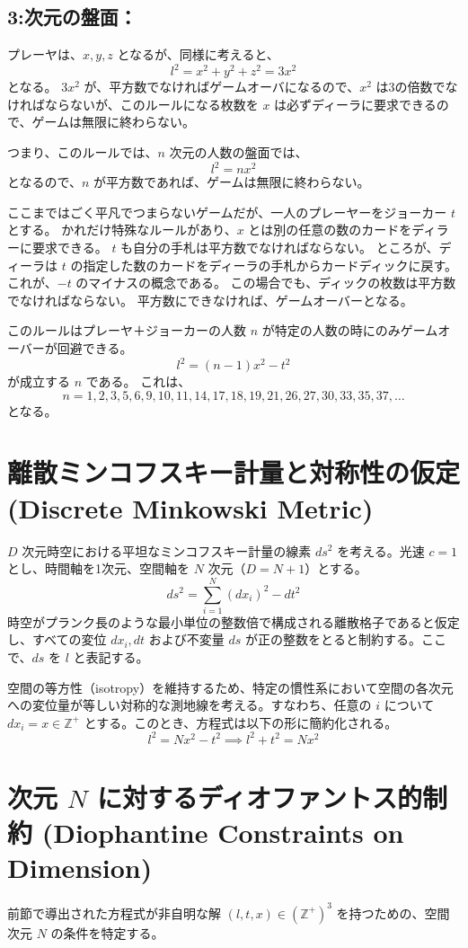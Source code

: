 \documentclass[a4paper,11pt]{ltjsarticle}
\begin{document}
\subsection*{3:次元の盤面：}
プレーヤは、\( x, y, z \) となるが、同様に考えると、
\[ l^2 = x^2 + y^2 + z^2 = 3x^2 \]
となる。
\( 3x^2 \) が、平方数でなければゲームオーバになるので、\( x^2 \) は3の倍数でなければならないが、このルールになる枚数を \( x \) は必ずディーラに要求できるので、ゲームは無限に終わらない。

つまり、このルールでは、\( n \) 次元の人数の盤面では、
\[ l^2 = n x^2 \]
となるので、\( n \) が平方数であれば、ゲームは無限に終わらない。

ここまではごく平凡でつまらないゲームだが、一人のプレーヤーをジョーカー \( t \) とする。
かれだけ特殊なルールがあり、\( x \) とは別の任意の数のカードをディラーに要求できる。
\( t \) も自分の手札は平方数でなければならない。
ところが、ディーラは \( t \) の指定した数のカードをディーラの手札からカードディックに戻す。
これが、\( -t \) のマイナスの概念である。
この場合でも、ディックの枚数は平方数でなければならない。
平方数にできなければ、ゲームオーバーとなる。

このルールはプレーヤ＋ジョーカーの人数 \( n \) が特定の人数の時にのみゲームオーバーが回避できる。
\[ l^2 = (n - 1) x^2 - t^2 \]
が成立する \( n \) である。
これは、
\[ n = 1, 2, 3, 5, 6, 9, 10, 11, 14, 17, 18, 19, 21, 26, 27, 30, 33, 35, 37, \dots \]
となる。

\section{離散ミンコフスキー計量と対称性の仮定 (Discrete Minkowski Metric)}
\(D\) 次元時空における平坦なミンコフスキー計量の線素 \(ds^2\) を考える。光速 \(c=1\) とし、時間軸を1次元、空間軸を \(N\) 次元（\(D = N+1\)）とする。
\[ ds^2 = \sum_{i=1}^{N} (dx_i)^2 - dt^2 \]
時空がプランク長のような最小単位の整数倍で構成される離散格子であると仮定し、すべての変位 \(dx_i, dt\) および不変量 \(ds\) が正の整数をとると制約する。ここで、\(ds\) を \(l\) と表記する。

空間の等方性（isotropy）を維持するため、特定の慣性系において空間の各次元への変位量が等しい対称的な測地線を考える。すなわち、任意の \(i\) について \(dx_i = x \in \mathbb{Z}^+\) とする。このとき、方程式は以下の形に簡約化される。
\[ l^2 = N x^2 - t^2 \implies l^2 + t^2 = N x^2 \]

\section{次元 \(N\) に対するディオファントス的制約 (Diophantine Constraints on Dimension)}
前節で導出された方程式が非自明な解 \((l, t, x) \in (\mathbb{Z}^+)^3\) を持つための、空間次元 \(N\) の条件を特定する。
\end{document}
